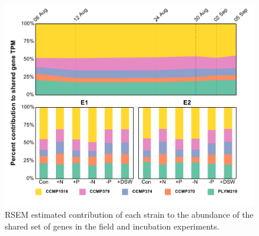 \begin{figure}[p!]

  \centering
  \includegraphics[width=1\textwidth]{Images/C6_FigureS10_SharedGeneComp.pdf}
  \caption[RSEM estimated contribution of each strain to the abundance of the shared set of genes in the field and incubation experiments]{RSEM estimated contribution of each strain to the abundance of the shared set of genes in the field and incubation experiments.}
    \label{fig:a5f10}
\end{figure}

